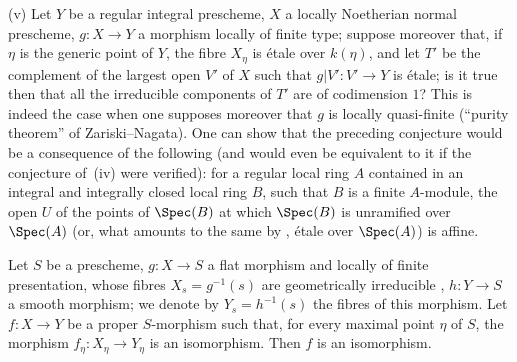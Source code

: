 \begin{remark}[21.12.14]
(v) Let $Y$ be a regular integral prescheme, $X$ a locally Noetherian normal prescheme, $g:X\to Y$ a morphism locally of finite type; suppose moreover that, if $\eta$ is the generic point of $Y$, the fibre $X_\eta$ is étale over $k(\eta)$, and let $T'$ be the complement of the largest open $V'$ of $X$ such that $g|V':V'\to Y$ is étale; is it true then that all the irreducible components of $T'$ are of codimension $1$?
This is indeed the case when one supposes moreover that $g$ is locally quasi-finite (``purity theorem'' of Zariski--Nagata).
One can show that the preceding conjecture would be a consequence of the following (and would even be equivalent to it if the conjecture of~(iv) were verified): for a regular local ring $A$ contained in an integral and integrally closed local ring $B$, such that $B$ is a finite $A$-module, the open $U$ of the points of $\Spec(B)$ at which $\Spec(B)$ is unramified over $\Spec(A)$ (or, what amounts to the same by , étale over $\Spec(A)$) is affine.
\end{remark}

\begin{proposition}[21.12.15]
\label{IV.21.12.15}
Let $S$ be a prescheme, $g:X\to S$ a flat morphism and locally of finite presentation, whose fibres $X_s=g^{-1}(s)$ are geometrically irreducible , $h:Y\to S$ a smooth morphism; we denote by $Y_s=h^{-1}(s)$ the fibres of this morphism.
Let $f:X\to Y$ be a proper $S$-morphism such that, for every maximal point $\eta$ of $S$, the morphism $f_\eta:X_\eta\to Y_\eta$ is an isomorphism.
Then $f$ is an isomorphism.
\end{proposition}


